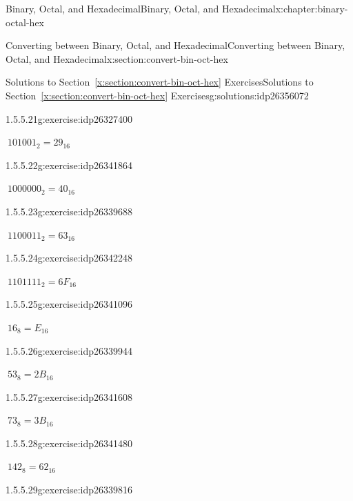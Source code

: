 \documentclass[twoside,10pt,]{book}
\newcommand{\xreffont}{\relax}
\numberwithin{equation}{section}
\begin{document}
\begin{chapterptx}{Binary, Octal, and Hexadecimal}{}{Binary, Octal, and Hexadecimal}{}{}{x:chapter:binary-octal-hex}
\begin{sectionptx}{Converting between Binary, Octal, and Hexadecimal}{}{Converting between Binary, Octal, and Hexadecimal}{}{}{x:section:convert-bin-oct-hex}
\begin{solutions-subsection}{Solutions to Section~{\xreffont\ref*{x:section:convert-bin-oct-hex}} Exercises}{}{Solutions to Section~{\xreffont\ref*{x:section:convert-bin-oct-hex}} Exercises}{}{}{g:solutions:idp26356072}
\begin{exercisegroup}
\begin{divisionsolutioneg}{1.5.5.21}{}{g:exercise:idp26327400}%
\par\smallskip%
\noindent\hypertarget{g:solution:idp26337128-main}{}\(\ 101001_2=29_{16}\)\end{divisionsolutioneg}%
\begin{divisionsolutioneg}{1.5.5.22}{}{g:exercise:idp26341864}%
\par\smallskip%
\noindent\hypertarget{g:solution:idp26339560-main}{}\(\ 1000000_2=40_{16}\)\end{divisionsolutioneg}%
\begin{divisionsolutioneg}{1.5.5.23}{}{g:exercise:idp26339688}%
\par\smallskip%
\noindent\hypertarget{g:solution:idp26342120-main}{}\(\ 1100011_2=63_{16}\)\end{divisionsolutioneg}%
\begin{divisionsolutioneg}{1.5.5.24}{}{g:exercise:idp26342248}%
\par\smallskip%
\noindent\hypertarget{g:solution:idp26338664-main}{}\(\ 1101111_2=6F_{16}\)\end{divisionsolutioneg}%
\end{exercisegroup}
\par\medskip\noindent
\begin{exercisegroup}
\begin{divisionsolutioneg}{1.5.5.25}{}{g:exercise:idp26341096}%
\par\smallskip%
\noindent\hypertarget{g:solution:idp26339432-main}{}\(\ 16_8=E_{16}\)\end{divisionsolutioneg}%
\begin{divisionsolutioneg}{1.5.5.26}{}{g:exercise:idp26339944}%
\par\smallskip%
\noindent\hypertarget{g:solution:idp26337256-main}{}\(\ 53_8=2B_{16}\)\end{divisionsolutioneg}%
\begin{divisionsolutioneg}{1.5.5.27}{}{g:exercise:idp26341608}%
\par\smallskip%
\noindent\hypertarget{g:solution:idp26343528-main}{}\(\ 73_8=3B_{16}\)\end{divisionsolutioneg}%
\begin{divisionsolutioneg}{1.5.5.28}{}{g:exercise:idp26341480}%
\par\smallskip%
\noindent\hypertarget{g:solution:idp26336744-main}{}\(\ 142_8=62_{16}\)\end{divisionsolutioneg}%
\begin{divisionsolutioneg}{1.5.5.29}{}{g:exercise:idp26339816}%

\end{divisionsolutioneg}
\end{exercisegroup}
\end{solutions-subsection}
\end{sectionptx}
\end{chapterptx}
\end{document}
